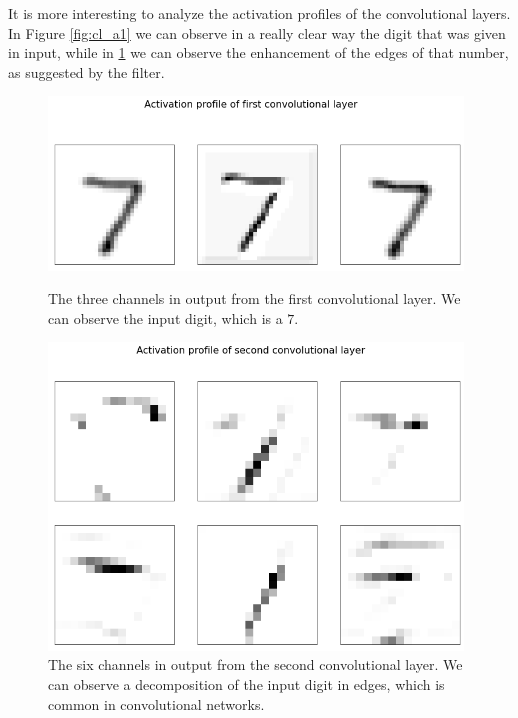 It is more interesting to analyze the activation profiles of the convolutional layers. In Figure \ref{fig:cl_a1} we can 
observe in a really clear way the digit that was given in input, while in \ref{fig:cl_a2} we can observe the enhancement 
of the edges of that number, as suggested by the filter.
\begin{figure}[h]
    \centering
    \begin{minipage}[t]{0.48\textwidth}
        \centering
        \includegraphics[width=0.98\textwidth]{Images/clas_act1.png}
        \caption{The three channels in output from the first convolutional layer. We can observe the input digit, which is a
        $7$. }
        \label{fig:cl_a1}
    \end{minipage}\hfill
    \begin{minipage}[t]{0.48\textwidth}
        \centering
        \includegraphics[width=0.98\textwidth]{Images/clas_act2.png}
        \caption{The six channels in output from the second convolutional layer. We can observe a decomposition of the input 
        digit in edges, which is common in convolutional networks. }
        \label{fig:cl_a2}
    \end{minipage}
\end{figure}